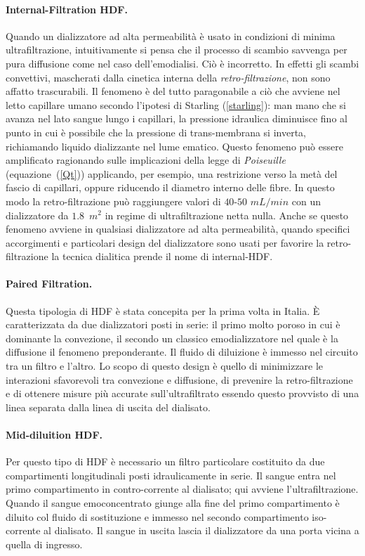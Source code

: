 \paragraph{Internal-Filtration HDF.}
Quando un dializzatore ad alta permeabilità è usato in condizioni di minima ultrafiltrazione, intuitivamente si pensa che il processo di scambio savvenga per pura diffusione come nel caso dell'emodialisi. Ciò è incorretto. In effetti gli scambi convettivi, mascherati dalla cinetica interna della \textit{retro-filtrazione}, non sono affatto trascurabili. Il fenomeno è del tutto paragonabile a ciò che avviene nel letto capillare umano secondo l'ipotesi di Starling (\figurename\ref{starling}): man mano che si avanza nel lato sangue lungo i capillari, la pressione idraulica diminuisce fino al punto in cui è possibile che la pressione di trans-membrana si inverta, richiamando liquido dializzante nel lume ematico. Questo fenomeno può essere amplificato ragionando sulle implicazioni della legge di \textit{Poiseuille} (equazione~(\ref{Qt})) applicando, per esempio, una restrizione verso la metà del fascio di capillari, oppure riducendo il diametro interno delle fibre. In questo modo la retro-filtrazione può raggiungere valori di $40$-$50$ $mL/min$ con un dializzatore da $1.8$~$m^2$ in regime di ultrafiltrazione netta nulla.
Anche se questo fenomeno avviene in qualsiasi dializzatore ad alta permeabilità, quando specifici accorgimenti e particolari design del dializzatore sono usati per favorire la retro-filtrazione la tecnica dialitica prende il nome di internal-HDF.

\paragraph{Paired Filtration.}
Questa tipologia di HDF è stata concepita per la prima volta in Italia. È caratterizzata da due dializzatori posti in serie: il primo molto poroso in cui è dominante la convezione, il secondo un classico emodializzatore nel quale è la diffusione il fenomeno preponderante. Il fluido di diluizione è immesso nel circuito tra un filtro e l'altro. Lo scopo di questo design è quello di minimizzare le interazioni sfavorevoli tra convezione e diffusione, di prevenire la retro-filtrazione e di ottenere misure più accurate sull'ultrafiltrato essendo questo provvisto di una linea separata dalla linea di uscita del dialisato.

\paragraph{Mid-diluition HDF.}
Per questo tipo di HDF è necessario un filtro particolare costituito da due compartimenti longitudinali posti idraulicamente in serie. Il sangue entra nel primo compartimento in contro-corrente al dialisato; qui avviene l'ultrafiltrazione. Quando il sangue emoconcentrato giunge alla fine del primo compartimento è diluito col fluido di sostituzione e immesso nel secondo compartimento iso-corrente al dialisato. Il sangue in uscita lascia il dializzatore da una porta vicina a quella di ingresso.

